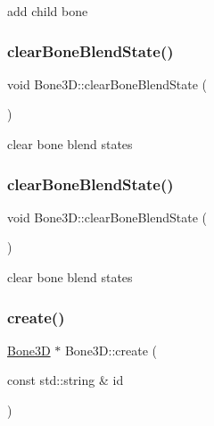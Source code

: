 add child bone \mbox{\label{classBone3D_af2cf6d23bf2e4853ff944d7d4d0ed424}} 
\subsubsection{\texorpdfstring{clear\+Bone\+Blend\+State()}{clearBoneBlendState()}\hspace{0.1cm}{\footnotesize\ttfamily [1/2]}}
{\footnotesize\ttfamily void Bone3\+D\+::clear\+Bone\+Blend\+State (\begin{DoxyParamCaption}{ }\end{DoxyParamCaption})}

clear bone blend states \mbox{\label{classBone3D_af2cf6d23bf2e4853ff944d7d4d0ed424}} 
\subsubsection{\texorpdfstring{clear\+Bone\+Blend\+State()}{clearBoneBlendState()}\hspace{0.1cm}{\footnotesize\ttfamily [2/2]}}
{\footnotesize\ttfamily void Bone3\+D\+::clear\+Bone\+Blend\+State (\begin{DoxyParamCaption}{ }\end{DoxyParamCaption})}

clear bone blend states \mbox{\label{classBone3D_a1708607e00df296c7377df101d43219a}} 
\subsubsection{\texorpdfstring{create()}{create()}\hspace{0.1cm}{\footnotesize\ttfamily [1/2]}}
{\footnotesize\ttfamily \hyperlink{classBone3D}{Bone3D} $\ast$ Bone3\+D\+::create (\begin{DoxyParamCaption}\item[{const std\+::string \&}]{id }\end{DoxyParamCaption})\hspace{0.3cm}{\ttfamily [static]}}

